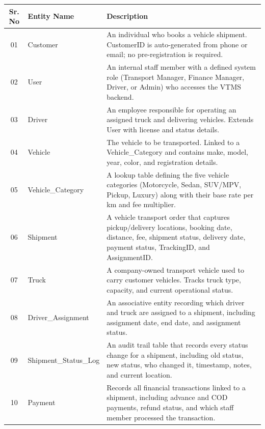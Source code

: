 \documentclass[12pt,a4paper]{report}
\begin{document}
\begin{longtable}{|c|p{4cm}|p{9cm}|}
\hline
\textbf{Sr. No} & \textbf{Entity Name} & \textbf{Description}\\
\hline

01 & Customer & An individual who books a vehicle shipment. CustomerID is auto-generated from phone or email; no pre-registration is required. \\
\hline

02 & User & An internal staff member with a defined system role (Transport Manager, Finance Manager, Driver, or Admin) who accesses the VTMS backend. \\
\hline

03 & Driver & An employee responsible for operating an assigned truck and delivering vehicles. Extends User with license and status details. \\
\hline

04 & Vehicle & The vehicle to be transported. Linked to a Vehicle\_Category and contains make, model, year, color, and registration details. \\
\hline

05 & Vehicle\_Category & A lookup table defining the five vehicle categories (Motorcycle, Sedan, SUV/MPV, Pickup, Luxury) along with their base rate per km and fee multiplier. \\
\hline

06 & Shipment & A vehicle transport order that captures pickup/delivery locations, booking date, distance, fee, shipment status, delivery date, payment status, TrackingID, and AssignmentID. \\
\hline

07 & Truck & A company-owned transport vehicle used to carry customer vehicles. Tracks truck type, capacity, and current operational status. \\
\hline

08 & Driver\_Assignment & An associative entity recording which driver and truck are assigned to a shipment, including assignment date, end date, and assignment status. \\
\hline

09 & Shipment\_Status\_Log & An audit trail table that records every status change for a shipment, including old status, new status, who changed it, timestamp, notes, and current location. \\
\hline

10 & Payment & Records all financial transactions linked to a shipment, including advance and COD payments, refund status, and which staff member processed the transaction. \\
\hline


\end{longtable}
\end{document}
